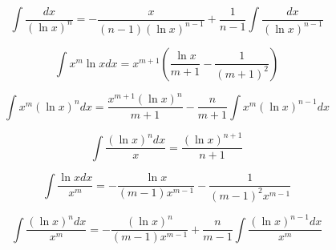 \documentclass[a4paper,12pt]{article} %
\begin{document}
\[\int\frac{dx}{(\ln x)^n}=-\frac{x}{(n-1)(\ln x)^{n-1}}+\frac{1}{n-1}\int\frac{dx}{(\ln x)^{n-1}}\]

\[\int x^m\ln x dx=x^{m+1}\left(\frac{\ln x}{m+1}-\frac{1}{(m+1)^2}\right)\]

\[\int x^m(\ln x)^n dx = \frac{x^{m+1}(\ln x)^n}{m+1} - \frac{n}{m+1}\int x^m(\ln x)^{n-1}dx\]

\[\int\frac{(\ln x)^n dx}{x}=\frac{(\ln x)^{n+1}}{n+1}\]

\[\int\frac{\ln x dx}{x^m}=-\frac{\ln x}{(m-1)x^{m-1}}-\frac{1}{(m-1)^2x^{m-1}}\]

\[\int \frac{(\ln x)^n dx}{x^m}=-\frac{(\ln x)^n}{(m-1)x^{m-1}}+\frac{n}{m-1}\int\frac{(\ln x)^{n-1}dx}{x^m}\]
\end{document}
